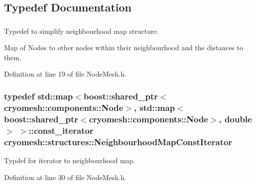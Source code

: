 \subsection{\-Typedef \-Documentation}
\hypertarget{namespacecryomesh_1_1structures_a50c955c70377b1dc7d3fcf1364d5e33e}{
\subsubsection[{\-Neighbourhood\-Map}]{}}\label{namespacecryomesh_1_1structures_a50c955c70377b1dc7d3fcf1364d5e33e}


\-Typedef to simplify neighbourhood map structure. 

\-Map of \-Nodes to other nodes within their neighbourhood and the distances to them. 

\-Definition at line 19 of file \-Node\-Mesh.\-h.

\hypertarget{namespacecryomesh_1_1structures_a321983538b31d02a5bb7345c72c63769}{
\subsubsection[{\-Neighbourhood\-Map\-Const\-Iterator}]{\setlength{\rightskip}{0pt plus 5cm}typedef std\-::map$<$boost\-::shared\-\_\-ptr$<${\bf cryomesh\-::components\-::\-Node}$>$, std\-::map$<$boost\-::shared\-\_\-ptr$<${\bf cryomesh\-::components\-::\-Node}$>$, double$>$ $>$\-::const\-\_\-iterator {\bf cryomesh\-::structures\-::\-Neighbourhood\-Map\-Const\-Iterator}}}\label{namespacecryomesh_1_1structures_a321983538b31d02a5bb7345c72c63769}


\-Typdef for iterator to neighbourhood map. 



\-Definition at line 30 of file \-Node\-Mesh.\-h.



